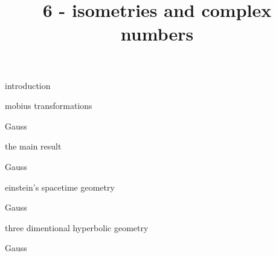 \documentclass{article}
\title{6 - isometries and complex numbers}
\newenvironment{andrew_section}[1]
    {
    \section{#1}
    \begin{itemize}
    }
    {
    \end{itemize}
    }
\begin{document}
\maketitle

\begin{andrew_section}{introduction}
\item
\end{andrew_section}

\begin{andrew_section}{mobius transformations}
    \item 
        Gauss
\end{andrew_section}

\begin{andrew_section}{the main result}
    \item 
        Gauss
\end{andrew_section}

\begin{andrew_section}{einstein's spacetime geometry}
    \item 
        Gauss
\end{andrew_section}

\begin{andrew_section}{three dimentional hyperbolic geometry}
    \item 
        Gauss
\end{andrew_section}
\end{document}

